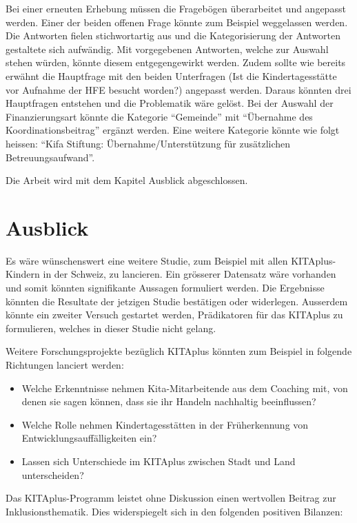 \documentclass[
  ngerman,
  11pt,
  paper=a4,
  twoside,
  titlepage=true,
  openright,
  abstract=on,
  toc=listofnumbered,
  numbers=noenddot,
  chapterprefix=true,
  headings=optiontohead,
  svgnames,
  dvipsnames]{scrreprt}
\providecommand{\tightlist}{%
  \setlength{\itemsep}{0pt}\setlength{\parskip}{0pt}}
\begin{document}
Bei einer erneuten Erhebung müssen die Fragebögen überarbeitet und
angepasst werden. Einer der beiden offenen Frage könnte zum Beispiel
weggelassen werden. Die Antworten fielen stichwortartig aus und die
Kategorisierung der Antworten gestaltete sich aufwändig. Mit
vorgegebenen Antworten, welche zur Auswahl stehen würden, könnte diesem
entgegengewirkt werden. Zudem sollte wie bereits erwähnt die Hauptfrage
mit den beiden Unterfragen (Ist die Kindertagesstätte vor Aufnahme der
HFE besucht worden?) angepasst werden. Daraus könnten drei Hauptfragen
entstehen und die Problematik wäre gelöst. Bei der Auswahl der
Finanzierungsart könnte die Kategorie “Gemeinde” mit “Übernahme des
Koordinationsbeitrag” ergänzt werden. Eine weitere Kategorie könnte wie
folgt heissen: “Kifa Stiftung: Übernahme/Unterstützung für zusätzlichen
Betreuungsaufwand”.

Die Arbeit wird mit dem Kapitel Ausblick abgeschlossen.

\hypertarget{sec:fazit}{%
\chapter{Ausblick}\label{sec:fazit}}

Es wäre wünschenswert eine weitere Studie, zum Beispiel mit allen
KITAplus-Kindern in der Schweiz, zu lancieren. Ein grösserer Datensatz
wäre vorhanden und somit könnten signifikante Aussagen formuliert
werden. Die Ergebnisse könnten die Resultate der jetzigen Studie
bestätigen oder widerlegen. Ausserdem könnte ein zweiter Versuch
gestartet werden, Prädikatoren für das KITAplus zu formulieren, welches
in dieser Studie nicht gelang.

Weitere Forschungsprojekte bezüglich KITAplus könnten zum Beispiel in
folgende Richtungen lanciert werden:

\begin{itemize}
\tightlist
\item
  Welche Erkenntnisse nehmen Kita-Mitarbeitende aus dem Coaching mit,
  von denen sie sagen können, dass sie ihr Handeln nachhaltig
  beeinflussen?
\item
  Welche Rolle nehmen Kindertagesstätten in der Früherkennung von
  Entwicklungsauffälligkeiten ein?
\item
  Lassen sich Unterschiede im KITAplus zwischen Stadt und Land
  unterscheiden?
\end{itemize}

Das KITAplus-Programm leistet ohne Diskussion einen wertvollen Beitrag
zur Inklusionsthematik. Dies widerspiegelt sich in den folgenden
positiven Bilanzen:
\end{document}
